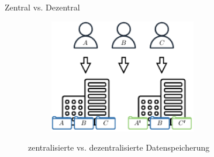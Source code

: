 \begin{frame}[c]{Zentral vs. Dezentral}
    \vspace{1.5em}

    \begin{figure}
        \centering
        \begin{subfigure}{0.4\textwidth}
            \centering
            \includegraphics[height=5cm]{./assets/central.drawio.pdf}
        \end{subfigure}
        \hspace{2cm}

        \caption{zentralisierte vs. dezentralisierte Datenspeicherung}
    \end{figure}
\end{frame}




